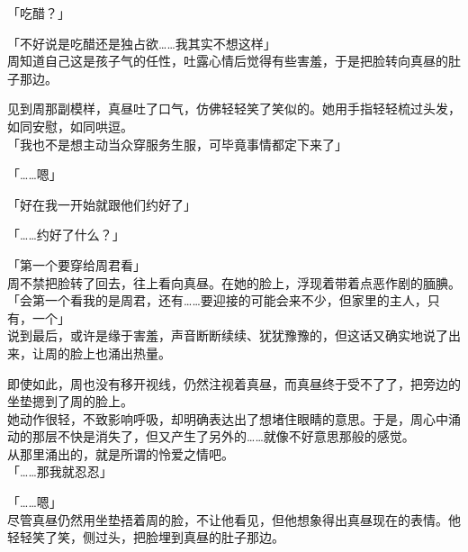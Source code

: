 「吃醋？」

「不好说是吃醋还是独占欲……我其实不想这样」\\

周知道自己这是孩子气的任性，吐露心情后觉得有些害羞，于是把脸转向真昼的肚子那边。

见到周那副模样，真昼吐了口气，仿佛轻轻笑了笑似的。她用手指轻轻梳过头发，如同安慰，如同哄逗。\\

「我也不是想主动当众穿服务生服，可毕竟事情都定下来了」

「……嗯」

「好在我一开始就跟他们约好了」

「……约好了什么？」

「第一个要穿给周君看」\\

周不禁把脸转了回去，往上看向真昼。在她的脸上，浮现着带着点恶作剧的腼腆。\\

「会第一个看我的是周君，还有……要迎接的可能会来不少，但家里的主人，只有，一个」\\

说到最后，或许是缘于害羞，声音断断续续、犹犹豫豫的，但这话又确实地说了出来，让周的脸上也涌出热量。

即使如此，周也没有移开视线，仍然注视着真昼，而真昼终于受不了了，把旁边的坐垫摁到了周的脸上。\\

她动作很轻，不致影响呼吸，却明确表达出了想堵住眼睛的意思。于是，周心中涌动的那层不快是消失了，但又产生了另外的……就像不好意思那般的感觉。\\

从那里涌出的，就是所谓的怜爱之情吧。\\

「……那我就忍忍」

「……嗯」\\

尽管真昼仍然用坐垫捂着周的脸，不让他看见，但他想象得出真昼现在的表情。他轻轻笑了笑，侧过头，把脸埋到真昼的肚子那边。
